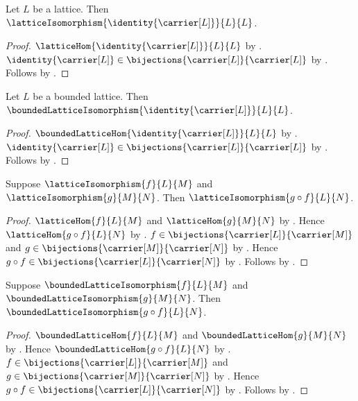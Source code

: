 \begin{proposition}\label{identity_lattice_isomorphism}
    Let $L$ be a lattice.
    Then $\latticeIsomorphism{\identity{\carrier[L]}}{L}{L}$.
\end{proposition}
\begin{proof}
    $\latticeHom{\identity{\carrier[L]}}{L}{L}$ by
        .
    $\identity{\carrier[L]}\in
        \bijections{\carrier[L]}{\carrier[L]}$ by
        .
    Follows by .
\end{proof}

\begin{proposition}\label{identity_bounded_lattice_isomorphism}
    Let $L$ be a bounded lattice.
    Then $\boundedLatticeIsomorphism
        {\identity{\carrier[L]}}{L}{L}$.
\end{proposition}
\begin{proof}
    $\boundedLatticeHom{\identity{\carrier[L]}}{L}{L}$ by
        .
    $\identity{\carrier[L]}\in
        \bijections{\carrier[L]}{\carrier[L]}$ by
        .
    Follows by .
\end{proof}

\begin{theorem}\label{lattice_isomorphism_composition}
    Suppose $\latticeIsomorphism{f}{L}{M}$ and
        $\latticeIsomorphism{g}{M}{N}$.
    Then $\latticeIsomorphism{g\circ f}{L}{N}$.
\end{theorem}
\begin{proof}
    $\latticeHom{f}{L}{M}$ and $\latticeHom{g}{M}{N}$ by
        .
    Hence $\latticeHom{g\circ f}{L}{N}$ by
        .
    $f\in\bijections{\carrier[L]}{\carrier[M]}$ and
        $g\in\bijections{\carrier[M]}{\carrier[N]}$ by
        .
    Hence $g\circ f\in\bijections{\carrier[L]}{\carrier[N]}$ by
        .
    Follows by .
\end{proof}

\begin{theorem}\label{bounded_lattice_isomorphism_composition}
    Suppose $\boundedLatticeIsomorphism{f}{L}{M}$ and
        $\boundedLatticeIsomorphism{g}{M}{N}$.
    Then $\boundedLatticeIsomorphism{g\circ f}{L}{N}$.
\end{theorem}
\begin{proof}
    $\boundedLatticeHom{f}{L}{M}$ and
        $\boundedLatticeHom{g}{M}{N}$ by
        .
    Hence $\boundedLatticeHom{g\circ f}{L}{N}$ by
        .
    $f\in\bijections{\carrier[L]}{\carrier[M]}$ and
        $g\in\bijections{\carrier[M]}{\carrier[N]}$ by
        .
    Hence $g\circ f\in\bijections{\carrier[L]}{\carrier[N]}$ by
        .
    Follows by .
\end{proof}

